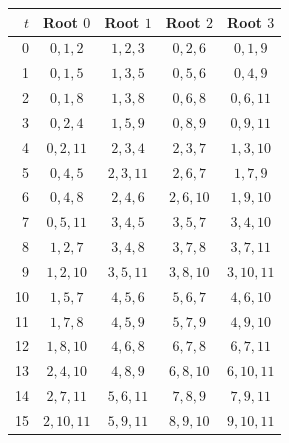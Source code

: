 \begin{tabular}{rcccc}
\toprule
$t$ & Root $0$ & Root $1$ & Root $2$ & Root $3$ \\
\midrule
0 & $0,1,2$ & $1,2,3$ & $0,2,6$ & $0,1,9$ \\
1 & $0,1,5$ & $1,3,5$ & $0,5,6$ & $0,4,9$ \\
2 & $0,1,8$ & $1,3,8$ & $0,6,8$ & $0,6,11$ \\
3 & $0,2,4$ & $1,5,9$ & $0,8,9$ & $0,9,11$ \\
4 & $0,2,11$ & $2,3,4$ & $2,3,7$ & $1,3,10$ \\
5 & $0,4,5$ & $2,3,11$ & $2,6,7$ & $1,7,9$ \\
6 & $0,4,8$ & $2,4,6$ & $2,6,10$ & $1,9,10$ \\
7 & $0,5,11$ & $3,4,5$ & $3,5,7$ & $3,4,10$ \\
8 & $1,2,7$ & $3,4,8$ & $3,7,8$ & $3,7,11$ \\
9 & $1,2,10$ & $3,5,11$ & $3,8,10$ & $3,10,11$ \\
10 & $1,5,7$ & $4,5,6$ & $5,6,7$ & $4,6,10$ \\
11 & $1,7,8$ & $4,5,9$ & $5,7,9$ & $4,9,10$ \\
12 & $1,8,10$ & $4,6,8$ & $6,7,8$ & $6,7,11$ \\
13 & $2,4,10$ & $4,8,9$ & $6,8,10$ & $6,10,11$ \\
14 & $2,7,11$ & $5,6,11$ & $7,8,9$ & $7,9,11$ \\
15 & $2,10,11$ & $5,9,11$ & $8,9,10$ & $9,10,11$ \\
\bottomrule
\end{tabular}
